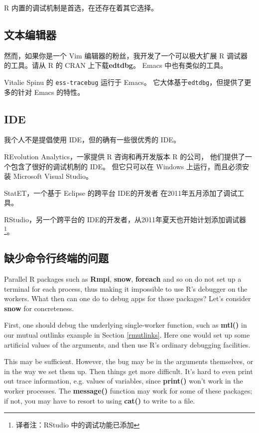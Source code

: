 R 内置的调试机制是首选，在还存在着其它选择。

\subsection{文本编辑器}

然而，如果你是一个 Vim 编辑器的粉丝，我开发了一个可以极大扩展 R 调试器
的工具。请从 R 的 CRAN 上下载{\bf edtdbg}。
Emacs 中也有类似的工具。

Vitalie Spinu 的 {\tt ess-tracebug} 运行于 Emacs。
它大体基于{\tt edtdbg}，但提供了更多的针对 Emacs 的特性。

\subsection{IDE}

我个人不是提倡使用 IDE，但的确有一些很优秀的 IDE。

REvolution Analytics，一家提供 R 咨询和再开发版本 R 的公司，
他们提供了一个包含了很好的调试机制的 IDE。
但它只可以在 Windows 上运行，而且必须安装 Microsoft Visual Studio。

StatET，一个基于 Eclipse 的跨平台 IDE的开发者
在2011年五月添加了调试工具。


RStudio，另一个跨平台的 IDE的开发者，从2011年夏天也开始计划添加调试器
\footnote{译者注：RStudio 中的调试功能已添加}。


\subsection{缺少命令行终端的问题}

Parallel R packages such as {\bf Rmpi}, {\bf snow}, {\bf foreach} and so
on do not set up a terminal for each process, thus making it impossible
to use R's debugger on the workers.  What then can one do to debug apps
for those packages?  Let's consider {\bf snow} for concreteness.

First, one should debug the underlying single-worker function, such as {\bf
mtl()} in our mutual outlinks example in Section \ref{rmutlinks}.  Here
one would set up some artificial values of the arguments, and then use
R's ordinary debugging facilities.

This may be sufficient.  However, the bug may be in the arguments
themselves, or in the way we set them up.  Then things get more
difficult.  It's hard to even print out trace information, e.g. values
of variables, since {\bf print()} won't work in the worker processes.
The {\bf message()} function may work for some of these packages; if
not, you may have to resort to using {\bf cat()} to write to a file.

